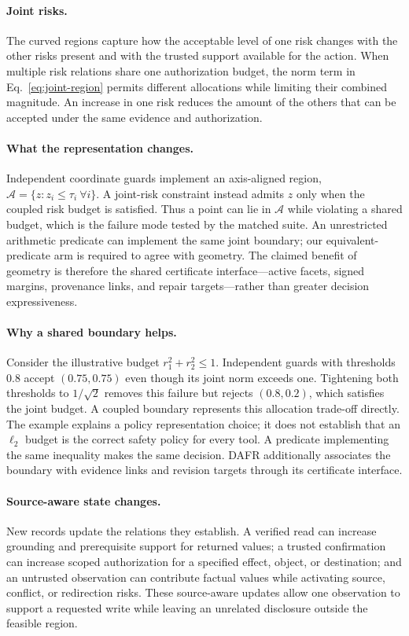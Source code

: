 \documentclass[letterpaper]{article}
\begin{document}
\paragraph{Joint risks.}
The curved regions capture how the acceptable level of one risk changes with the other risks present and with the trusted support available for the action. When multiple risk relations share one authorization budget, the norm term in Eq.~\eqref{eq:joint-region} permits different allocations while limiting their combined magnitude. An increase in one risk reduces the amount of the others that can be accepted under the same evidence and authorization.

\paragraph{What the representation changes.}
Independent coordinate guards implement an axis-aligned region, $\mathcal A=\{z: z_i\leq\tau_i\ \forall i\}$. A joint-risk constraint instead admits $z$ only when the coupled risk budget is satisfied. Thus a point can lie in $\mathcal A$ while violating a shared budget, which is the failure mode tested by the matched suite. An unrestricted arithmetic predicate can implement the same joint boundary; our equivalent-predicate arm is required to agree with geometry. The claimed benefit of geometry is therefore the shared certificate interface---active facets, signed margins, provenance links, and repair targets---rather than greater decision expressiveness.

\paragraph{Why a shared boundary helps.}
Consider the illustrative budget $r_1^2+r_2^2\leq1$. Independent guards with thresholds $0.8$ accept $(0.75,0.75)$ even though its joint norm exceeds one. Tightening both thresholds to $1/\sqrt{2}$ removes this failure but rejects $(0.8,0.2)$, which satisfies the joint budget. A coupled boundary represents this allocation trade-off directly. The example explains a policy representation choice; it does not establish that an $\ell_2$ budget is the correct safety policy for every tool. A predicate implementing the same inequality makes the same decision. DAFR additionally associates the boundary with evidence links and revision targets through its certificate interface.

\paragraph{Source-aware state changes.}
New records update the relations they establish. A verified read can increase grounding and prerequisite support for returned values; a trusted confirmation can increase scoped authorization for a specified effect, object, or destination; and an untrusted observation can contribute factual values while activating source, conflict, or redirection risks. These source-aware updates allow one observation to support a requested write while leaving an unrelated disclosure outside the feasible region.
\end{document}
